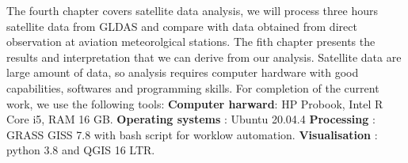 The fourth chapter covers satellite data analysis, we will process three hours satellite data from GLDAS and compare with data obtained
from direct observation at aviation meteorolgical stations. \newline
The fith chapter presents the results and interpretation that we can derive from our analysis.\newline
Satellite data  are large amount of data, so analysis  requires computer hardware with good capabilities, softwares and programming skills. \newline
For completion of the current work, we use the following tools: \newline
\textbf {Computer harward}: HP Probook, Intel R Core i5, RAM 16 GB. \newline
\textbf {Operating systems} : Ubuntu 20.04.4 \newline
\textbf {Processing} : GRASS GISS 7.8  with bash script for worklow automation. \newline
\textbf {Visualisation} : python 3.8 and  QGIS 16 LTR.


